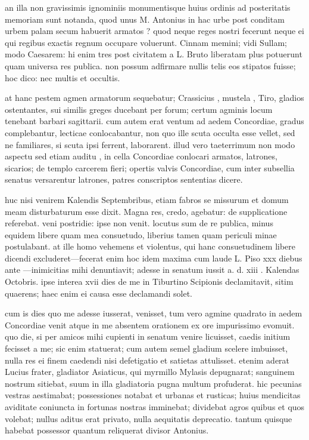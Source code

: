  an illa non gravissimis ignominiis monumentisque huius ordinis ad posteritatis memoriam sunt notanda, quod unus M. Antonius in hac urbe post conditam urbem palam secum habuerit armatos ? quod neque reges nostri fecerunt neque ei qui regibus exactis regnum occupare voluerunt. Cinnam memini; vidi Sullam; modo Caesarem: hi enim tres post civitatem a L. Bruto liberatam plus potuerunt quam universa res publica. non possum adfirmare nullis telis eos stipatos fuisse; hoc dico: nec multis et occultis.

 at hanc pestem agmen armatorum sequebatur; Crassicius , mustela , Tiro, gladios ostentantes, sui similis greges ducebant per forum; certum agminis locum tenebant barbari sagittarii. cum autem erat ventum ad aedem Concordiae, gradus complebantur, lecticae conlocabantur, non quo ille scuta occulta esse vellet, sed ne familiares, si scuta ipsi ferrent, laborarent. illud vero taeterrimum non modo aspectu sed etiam auditu , in cella Concordiae conlocari armatos, latrones, sicarios; de templo carcerem fieri; opertis valvis Concordiae, cum inter subsellia senatus versarentur latrones, patres conscriptos sententias dicere.

 huc nisi venirem Kalendis Septembribus, etiam fabros se missurum et domum meam disturbaturum esse dixit. Magna res, credo, agebatur: de supplicatione referebat. veni postridie: ipse non venit. locutus sum de re publica, minus equidem libere quam mea consuetudo, liberius tamen quam periculi minae postulabant. at ille homo vehemens et violentus, qui hanc consuetudinem libere dicendi excluderet—fecerat enim hoc idem maxima cum laude L. Piso xxx diebus ante —inimicitias mihi denuntiavit; adesse in senatum iussit a. d. xiii . Kalendas Octobris. ipse interea xvii dies de me in Tiburtino Scipionis declamitavit, sitim quaerens; haec enim ei causa esse declamandi solet.

 cum is dies quo me adesse iusserat, venisset, tum vero agmine quadrato in aedem Concordiae venit atque in me absentem orationem ex ore impurissimo evomuit. quo die, si per amicos mihi cupienti in senatum venire licuisset, caedis initium fecisset a me; sic enim statuerat; cum autem semel gladium scelere imbuisset, nulla res ei finem caedendi nisi defetigatio et satietas attulisset. etenim aderat Lucius frater, gladiator Asiaticus, qui myrmillo Mylasis depugnarat; sanguinem nostrum sitiebat, suum in illa gladiatoria pugna multum profuderat. hic pecunias vestras aestimabat; possessiones notabat et urbanas et rusticas; huius mendicitas aviditate coniuncta in fortunas nostras imminebat; dividebat agros quibus et quos volebat; nullus aditus erat privato, nulla aequitatis deprecatio. tantum quisque habebat possessor quantum reliquerat divisor Antonius.

